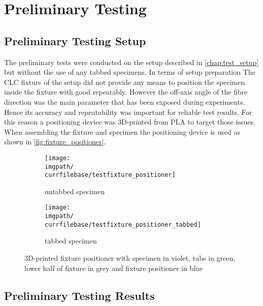 \chapter{Preliminary Testing}
\label{chap:\currfilebase}

\section{Preliminary Testing Setup}
\label{sec:preliminary_testing_setup}

The preliminary tests were conducted on the setup described in \autoref{chap:test_setup} but without the use of any tabbed specimens. In terms of setup preparation The CLC fixture of the setup did not provide any means to position the specimen inside the fixture with good repeatably. However the off-axis angle of the fibre direction was the main parameter that has been exposed during experiments. Hence its accuracy and repeatability was important for reliable test results. For this reason a positioning device was 3D-printed from PLA to target those issues. When assembling the fixture and specimen the positioning device is used as shown in \autoref{fig:fixture_positioner}.

\begin{figure}[!ht]
    \centering
    \begin{subfigure}[t]{\dimexpr(\distTextWidth-\distColSep)/2\relax}
        \centering
        \texttt{[image: \\imgpath/\\currfilebase/testfixture\_positioner]}
        \caption{untabbed specimen}
        \label{fig:fixture_positioner_untabbed}
    \end{subfigure}%
    \hfill
    \begin{subfigure}[t]{\dimexpr(\distTextWidth-\distColSep)/2\relax}
        \centering
        \texttt{[image: \\imgpath/\\currfilebase/testfixture\_positioner\_tabbed]}
        \caption{tabbed specimen}
        \label{fig:fixture_positioner_tabbed}
    \end{subfigure}
    \caption{3D-printed fixture positioner with specimen in violet, tabs in green, lower half of fixture in grey and fixture positioner in blue}
    \label{fig:fixture_positioner}
\end{figure}

\section{Preliminary Testing Results}
\label{sec:preliminary_testing_results}

